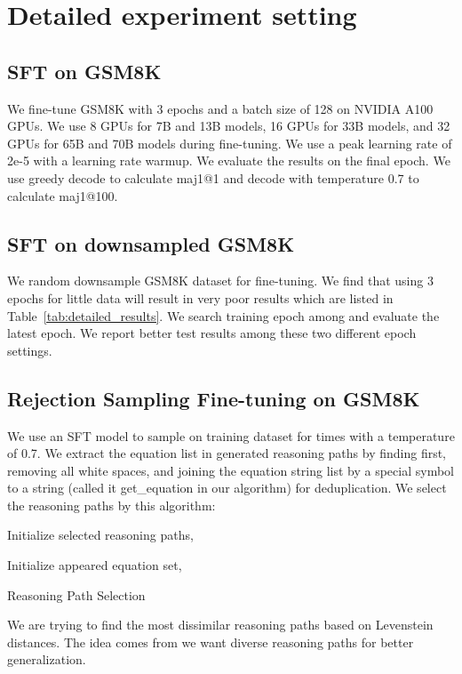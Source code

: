 \documentclass{article} \usepackage{iclr2021_conference,times}
\begin{document}



\appendix
\section{Detailed experiment setting}
\subsection{SFT on GSM8K}
We fine-tune GSM8K with 3 epochs and a batch size of 128 on NVIDIA A100 GPUs. We use 8 GPUs for 7B and 13B models, 16 GPUs for 33B models, and 32 GPUs for 65B and 70B models during fine-tuning.
We use a peak learning rate of 2e-5 with a  learning rate warmup. We evaluate the results on the final epoch. We use greedy decode to calculate maj1@1 and decode with temperature 0.7 to calculate maj1@100.

\subsection{SFT on downsampled GSM8K}
We random downsample GSM8K dataset for fine-tuning. We find that using 3 epochs for little data will result in very poor results which are listed in Table~\ref{tab:detailed_results}. We search training epoch among  and evaluate the latest epoch. We report better test results among these two different epoch settings.

\subsection{Rejection Sampling Fine-tuning on GSM8K}
We use an SFT model  to sample on training dataset for  times with a temperature of 0.7. 
We extract the equation list in generated reasoning paths by finding  first,  removing all white spaces, and joining the equation string list by a special symbol to a string (called it get\_equation in our algorithm) for deduplication.
We select the reasoning paths by this algorithm:
\begin{algorithm}[H]
\SetAlgoLined
{}
Initialize selected reasoning paths, 

Initialize appeared equation set, 

\caption{Reasoning Path Selection}
\label{alg:path_select}
\end{algorithm}
We are trying to find the most dissimilar reasoning paths based on Levenstein distances. The idea comes from we want diverse reasoning paths for better generalization.
\end{document}
